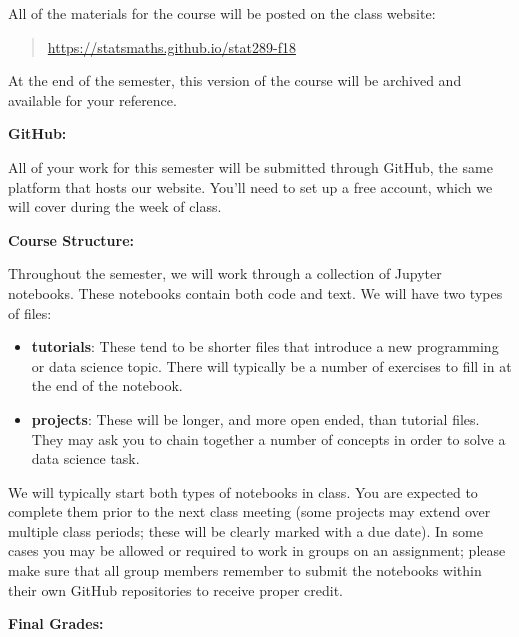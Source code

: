 \documentclass[12pt]{article}
\begin{document}
All of the materials for the course will be posted on the class website:
\begin{quote}
\url{https://statsmaths.github.io/stat289-f18}
\end{quote}
At the end of the semester, this version of the course will be archived and
available for your reference.

\bigskip

\textbf{GitHub:} \vspace{6pt}

All of your work for this semester will be submitted through GitHub,
the same platform that hosts our website. You'll need to set up a free
account, which we will cover during the week of class.

\bigskip

\textbf{Course Structure:} \vspace{6pt}

Throughout the semester, we will work through a collection of Jupyter
notebooks. These notebooks contain both code and text. We will have two types
of files:
\begin{itemize}\setlength\itemsep{0em}
\item \textbf{tutorials}: These tend to be shorter files that introduce a new
programming or data science topic. There will typically be a number of
exercises to fill in at the end of the notebook.
\item \textbf{projects}: These will be longer, and more open ended, than 
tutorial files. They may ask you to chain together a number of concepts in 
order to solve a data science task.
\end{itemize}
We will typically start both types of notebooks in class. You are expected to
complete them prior to the next class meeting (some projects may extend over
multiple class periods; these will be clearly marked with a due date). In some
cases you may be allowed or required to work in groups on an assignment; please
make sure that all group members remember to submit the notebooks within their
own GitHub repositories to receive proper credit.

\bigskip

\textbf{Final Grades:} \vspace{6pt}
\end{document}

